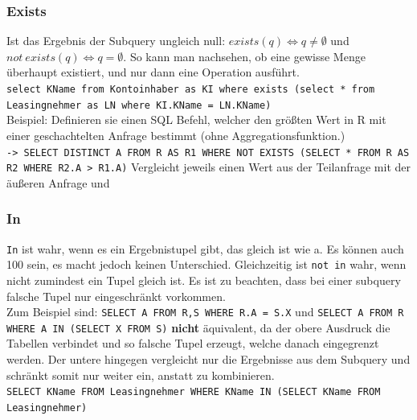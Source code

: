 \documentclass{article}
\begin{document}
	\subsubsection{Exists}
	Ist das Ergebnis der Subquery ungleich null: $exists(q) \iff q\ne \emptyset$ und $not\ exists(q) \iff q = \emptyset$. So kann man nachsehen, ob eine gewisse Menge überhaupt existiert, und nur dann eine Operation ausführt. \\
	\verb|select KName from Kontoinhaber as KI where exists (select * from Leasingnehmer as LN where KI.KName = LN.KName)| \\
	Beispiel: Definieren sie einen SQL Befehl, welcher den größten Wert in R mit einer geschachtelten Anfrage bestimmt (ohne Aggregationsfunktion.) \\
	\verb|-> SELECT DISTINCT A FROM R AS R1 WHERE NOT EXISTS (SELECT * FROM R AS R2 WHERE R2.A > R1.A)| Vergleicht jeweils einen Wert aus der Teilanfrage mit der äußeren Anfrage und 
	\subsubsection{In}
	\verb|In| ist wahr, wenn es ein Ergebnistupel gibt, das gleich ist wie a. Es können auch 100 sein, es macht jedoch keinen Unterschied. Gleichzeitig ist \verb|not in| wahr, wenn nicht zumindest ein Tupel gleich ist. Es ist zu beachten, dass bei einer subquery falsche Tupel nur eingeschränkt vorkommen. \\
	Zum Beispiel sind: \verb|SELECT A FROM R,S WHERE R.A = S.X| und \verb|SELECT A FROM R WHERE A IN (SELECT X FROM S)| \textbf{nicht} äquivalent, da der obere Ausdruck die Tabellen verbindet und so falsche Tupel erzeugt, welche danach eingegrenzt werden. Der untere hingegen vergleicht nur die Ergebnisse aus dem Subquery und schränkt somit nur weiter ein, anstatt zu kombinieren. \\
	\verb|SELECT KName FROM Leasingnehmer WHERE KName IN (SELECT KName FROM Leasingnehmer)|
\end{document}

